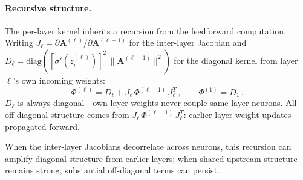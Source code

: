 \documentclass[10pt]{article}
\newcommand{\vA}{\mathbf{A}}
\begin{document}
\paragraph{Recursive structure.}
The per-layer kernel inherits a recursion from the feedforward computation.  Writing $J_\ell = \partial\vA^{(\ell)}/\partial\vA^{(\ell-1)}$ for the inter-layer Jacobian and $D_\ell = \mathrm{diag}([\sigma'(z_i^{(\ell)})]^2\,\lVert\vA^{(\ell-1)}\rVert^2)$ for the diagonal kernel from layer~$\ell$'s own incoming weights:
%
\begin{equation}\label{eq:phi-recursion}
  \Phi^{(\ell)} = D_\ell + J_\ell\,\Phi^{(\ell-1)}\,J_\ell^T\,,
  \qquad
  \Phi^{(1)} = D_1\,.
\end{equation}
%
$D_\ell$ is always diagonal---own-layer weights never couple same-layer neurons.  All off-diagonal structure comes from $J_\ell\,\Phi^{(\ell-1)}\,J_\ell^T$: earlier-layer weight updates propagated forward.

When the inter-layer Jacobians decorrelate across neurons, this recursion can amplify diagonal structure from earlier layers; when shared upstream structure remains strong, substantial off-diagonal terms can persist.
\end{document}

